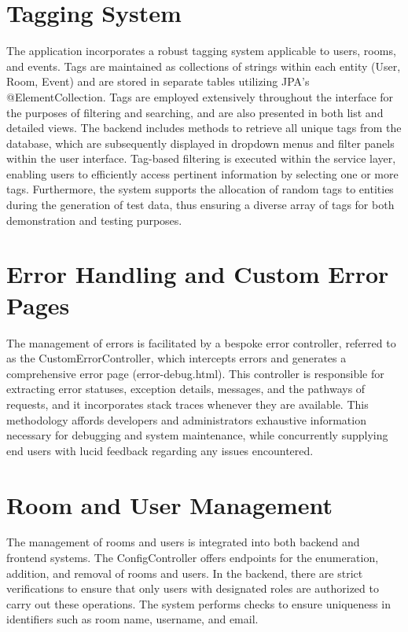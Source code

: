\section{Tagging System}\label{sec:tagging-system}
The application incorporates a robust tagging system applicable to users, rooms, and events.
Tags are maintained as collections of strings within each entity (User, Room, Event) and are stored in separate tables utilizing JPA's @ElementCollection.
Tags are employed extensively throughout the interface for the purposes of filtering and searching, and are also presented in both list and detailed views.
The backend includes methods to retrieve all unique tags from the database, which are subsequently displayed in dropdown menus and filter panels within the user interface.
Tag-based filtering is executed within the service layer, enabling users to efficiently access pertinent information by selecting one or more tags.
Furthermore, the system supports the allocation of random tags to entities during the generation of test data, thus ensuring a diverse array of tags for both demonstration and testing purposes.


\section{Error Handling and Custom Error Pages}\label{sec:error-handling-and-custom-error-pages}
The management of errors is facilitated by a bespoke error controller, referred to as the CustomErrorController, which intercepts errors and generates a comprehensive error page (error-debug.html).
This controller is responsible for extracting error statuses, exception details, messages, and the pathways of requests, and it incorporates stack traces whenever they are available.
This methodology affords developers and administrators exhaustive information necessary for debugging and system maintenance, while concurrently supplying end users with lucid feedback regarding any issues encountered.


\section{Room and User Management}\label{sec:room-and-user-management}
The management of rooms and users is integrated into both backend and frontend systems.
The ConfigController offers endpoints for the enumeration, addition, and removal of rooms and users.
In the backend, there are strict verifications to ensure that only users with designated roles are authorized to carry out these operations.
The system performs checks to ensure uniqueness in identifiers such as room name, username, and email.

